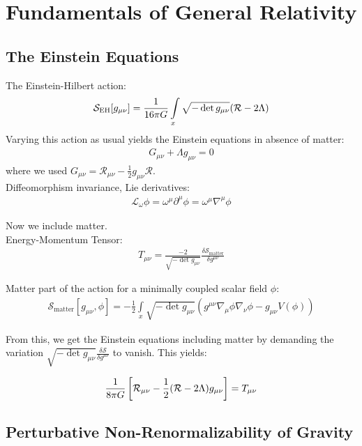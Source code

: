 \chapter{Fundamentals of General Relativity}
\blindtext 
\section{The Einstein Equations}
\Blindtext
The Einstein-Hilbert action:
\begin{align}
	\mathcal{S}_{\text{EH}}[g_{\mu\nu}] = \frac{1}{16\pi G} \int\limits_x \sqrt{-\operatorname{det}g_{\mu\nu}} (\mathcal{R} - 2\Lambda)
\end{align}
Varying this action as usual yields the Einstein equations in absence of matter:
\begin{align}
	G_{\mu\nu} + \Lambda g_{\mu\nu} = 0
\end{align}
where we used $G_{\mu\nu} = \mathcal{R}_{\mu\nu} - \frac{1}{2}g_{\mu\nu}\mathcal{R}$. \\

Diffeomorphism invariance, Lie derivatives:
\begin{align}
	\mathcal{L}_{\omega}\phi = \omega^{\mu}\partial^{\mu}\phi = \omega^{\mu}\nabla^{\mu}\phi
\end{align}

Now we include matter. \\

Energy-Momentum Tensor:
\begin{align}
	T_{\mu\nu} = \frac{-2}{\sqrt{-\operatorname{det}g_{\mu\nu}}} \frac{\delta\mathcal{S}_{\text{matter}}}{\delta g^{\mu\nu}}
\end{align}

Matter part of the action for a minimally coupled scalar field $\phi$:
\begin{align}
	\mathcal{S}_{\text{matter}}[g_{\mu\nu}, \phi] = -\frac{1}{2} \int\limits_x \sqrt{-\operatorname{det}g_{\mu\nu}}\left( g^{\mu\nu}\nabla_{\mu}\phi\nabla_{\nu}\phi - g_{\mu\nu} V(\phi) \right)
\end{align}

From this, we get the Einstein equations including matter by demanding the variation $\sqrt{-\operatorname{det}g_{\mu\nu}}\frac{\delta\mathcal{S}}{\delta g^{\mu\nu}}$ to vanish. This yields:

\begin{align}
\frac{1}{8\pi G}\left[\mathcal{R}_{\mu\nu} - \frac{1}{2}(\mathcal{R} - 2\Lambda)g_{\mu\nu}\right] = T_{\mu\nu}	
\end{align}


\section{Perturbative Non-Renormalizability of Gravity}

\blindtext
